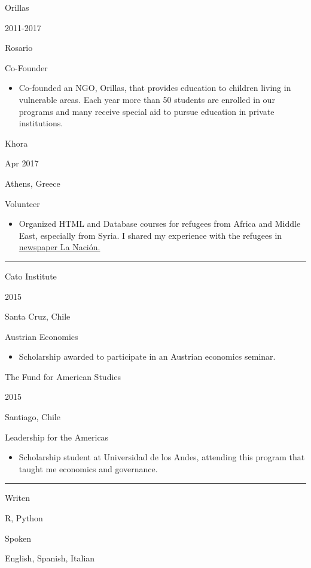\documentclass[a4paper,10pt]{article}
\newlength{\cvcolumngapwidth}
\newlength{\cvleftcolumnwidth}
\newlength{\cvrightcolumnwidth}
\newcommand{\cvsectionstyle}[1]{{\normalsize\cvsectionfont\textcolor{cvsectioncolor}{#1}}}
\newcommand{\cvtitlestyle}[1]{{\large\cvtitlefont\textcolor{cvtitlecolor}{#1}}}
\newcommand{\cvdurationstyle}[1]{{\small\cvdurationfont\textcolor{cvdurationcolor}{#1}}}
\newcommand{\cvheadingstyle}[1]{{\normalsize\cvheadingfont\textcolor{cvheadingcolor}{#1}}}
\newlength{\cvafteritemskipamount}
\newlength{\cvaftersectionskipamount}
\newlength{\cvbetweensectionandheadingextraskipamount}
\newlength{\cvaftertitleskipamount}
\newlength{\cvparskip}
\newcommand{\cvsection}[1]{
    \begin{minipage}[t]{\cvleftcolumnwidth}
        \raggedleft\cvsectionstyle{#1}
    \end{minipage}%
    \hspace{\cvcolumngapwidth}%
    \begin{minipage}[t]{\cvrightcolumnwidth}
        \textcolor{cvrulecolor}{\rule{\cvrightcolumnwidth}{0.3mm}}
    \end{minipage}

    \vspace{\cvaftersectionskipamount}
}
\newcommand{\cvitem}[2]{
    \begin{minipage}[t]{\cvleftcolumnwidth}
        \raggedleft #1
    \end{minipage}%
    \hspace{\cvcolumngapwidth}%
    \begin{minipage}[t]{\cvrightcolumnwidth}
        \setlength{\parskip}{\cvparskip} #2
    \end{minipage}

    \vspace{\cvafteritemskipamount}
}
\newcommand{\cvtitle}[1]{
    \cvtitlestyle{#1}

    \vspace{\cvaftertitleskipamount}
    \vspace{-\cvparskip}
}
\begin{document}
\cvitem{
    \cvheadingstyle{Orillas}

    \cvdurationstyle{2011-2017}

    \cvdurationstyle{Rosario}

}{
    \cvtitle{Co-Founder}
    \begin{itemize}[leftmargin=*]
        \item Co-founded an NGO, Orillas, that provides education to children living in vulnerable areas. Each year more than 50 students are enrolled in our programs and many receive special aid to pursue education in private institutions.
    \end{itemize}
}
\cvitem{
    \cvheadingstyle{Khora}

    \cvdurationstyle{Apr 2017}

    \cvdurationstyle{Athens, Greece}

}{
    \cvtitle{Volunteer}
    \begin{itemize}[leftmargin=*]
        \item Organized HTML and Database courses for refugees from Africa and Middle East, especially from Syria. I shared my experience with the refugees in \href{http://www.lanacion.com.ar/2035061-refugiados-en-grecia-historias-de-huidas-violencia-y-familias-separadas}{newspaper La Nación.}

    \end{itemize}
}


\cvsection{SEMINARS}

\vspace{\cvbetweensectionandheadingextraskipamount}

\cvitem{
    \cvheadingstyle{Cato Institute}

    \cvdurationstyle{2015}

    \cvdurationstyle{Santa Cruz, Chile}

}{
    \cvtitle{Austrian Economics}
    \begin{itemize}[leftmargin=*]
        \item Scholarship awarded to participate in an Austrian economics seminar.
    \end{itemize}

}

\cvitem{
    \cvheadingstyle{The Fund for American Studies}

    \cvdurationstyle{2015}

    \cvdurationstyle{Santiago, Chile}

}{
    \cvtitle{Leadership for the Americas}
    \begin{itemize}[leftmargin=*]
        \item Scholarship student at Universidad de los Andes, attending this program that taught me economics and governance.
    \end{itemize}

}


\cvsection{LANGUAGES}

\vspace{\cvbetweensectionandheadingextraskipamount}


\cvitem{
    \cvheadingstyle{Writen}
}{
    R, Python
}

\cvitem{
    \cvheadingstyle{Spoken}
}{
    English, Spanish, Italian
}
\end{document}
